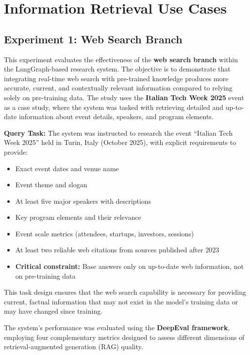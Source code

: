 \section{Information Retrieval Use Cases}

\subsection{Experiment 1: Web Search Branch}

This experiment evaluates the effectiveness of the \textbf{web search branch} within the LangGraph-based research system. The objective is to demonstrate that integrating real-time web search with pre-trained knowledge produces more accurate, current, and contextually relevant information compared to relying solely on pre-training data. The study uses the \textbf{Italian Tech Week 2025} event as a case study, where the system was tasked with retrieving detailed and up-to-date information about event details, speakers, and program elements.


\textbf{Query Task:} The system was instructed to research the event ``Italian Tech Week 2025'' held in Turin, Italy (October 2025), with explicit requirements to provide:
\begin{itemize}
  \item Exact event dates and venue name
  \item Event theme and slogan
  \item At least five major speakers with descriptions
  \item Key program elements and their relevance
  \item Event scale metrics (attendees, startups, investors, sessions)
  \item At least two reliable web citations from sources published after 2023
  \item \textbf{Critical constraint:} Base answers only on up-to-date web information, not on pre-training data
\end{itemize}

This task design ensures that the web search capability is necessary for providing current, factual information that may not exist in the model's training data or may have changed since training.

The system's performance was evaluated using the \textbf{DeepEval framework}, employing four complementary metrics designed to assess different dimensions of retrieval-augmented generation (RAG) quality.

